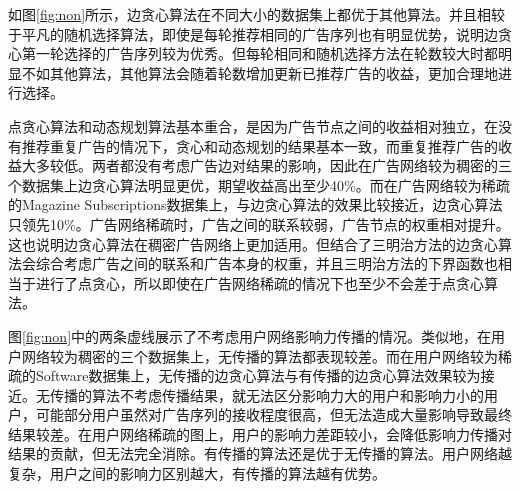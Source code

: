 如图\ref{fig:non}所示，边贪心算法在不同大小的数据集上都优于其他算法。并且相较于平凡的随机选择算法，即使是每轮推荐相同的广告序列也有明显优势，说明边贪心第一轮选择的广告序列较为优秀。但每轮相同和随机选择方法在轮数较大时都明显不如其他算法，其他算法会随着轮数增加更新已推荐广告的收益，更加合理地进行选择。

点贪心算法和动态规划算法基本重合，是因为广告节点之间的收益相对独立，在没有推荐重复广告的情况下，贪心和动态规划的结果基本一致，而重复推荐广告的收益大多较低。两者都没有考虑广告边对结果的影响，因此在广告网络较为稠密的三个数据集上边贪心算法明显更优，期望收益高出至少40\%。而在广告网络较为稀疏的Magazine Subscriptions数据集上，与边贪心算法的效果比较接近，边贪心算法只领先10\%。广告网络稀疏时，广告之间的联系较弱，广告节点的权重相对提升。这也说明边贪心算法在稠密广告网络上更加适用。但结合了三明治方法的边贪心算法会综合考虑广告之间的联系和广告本身的权重，并且三明治方法的下界函数也相当于进行了点贪心，所以即使在广告网络稀疏的情况下也至少不会差于点贪心算法。

图\ref{fig:non}中的两条虚线展示了不考虑用户网络影响力传播的情况。类似地，在用户网络较为稠密的三个数据集上，无传播的算法都表现较差。而在用户网络较为稀疏的Software数据集上，无传播的边贪心算法与有传播的边贪心算法效果较为接近。无传播的算法不考虑传播结果，就无法区分影响力大的用户和影响力小的用户，可能部分用户虽然对广告序列的接收程度很高，但无法造成大量影响导致最终结果较差。在用户网络稀疏的图上，用户的影响力差距较小，会降低影响力传播对结果的贡献，但无法完全消除。有传播的算法还是优于无传播的算法。用户网络越复杂，用户之间的影响力区别越大，有传播的算法越有优势。

